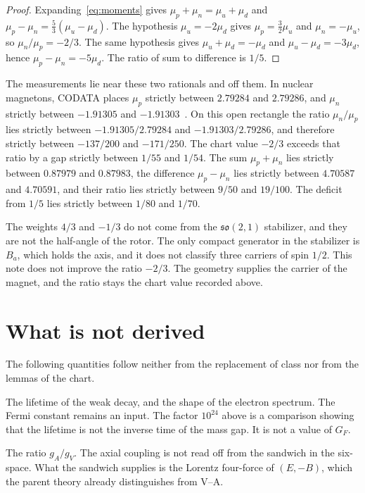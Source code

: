 \documentclass[a4paper]{article}
\begin{document}
\begin{proof}
Expanding~\eqref{eq:moments} gives \(\mu_p+\mu_n=\mu_u+\mu_d\) and \(\mu_p-\mu_n=\tfrac53(\mu_u-\mu_d)\). The hypothesis \(\mu_u=-2\mu_d\) gives \(\mu_p=\tfrac32\mu_u\) and \(\mu_n=-\mu_u\), so \(\mu_n/\mu_p=-2/3\). The same hypothesis gives \(\mu_u+\mu_d=-\mu_d\) and \(\mu_u-\mu_d=-3\mu_d\), hence \(\mu_p-\mu_n=-5\mu_d\). The ratio of sum to difference is \(1/5\).
\end{proof}

The measurements lie near these two rationals and off them. In nuclear magnetons, CODATA places \(\mu_p\) strictly between \(2.79284\) and \(2.79286\), and \(\mu_n\) strictly between \(-1.91305\) and \(-1.91303\)~\cite{codata2018}. On this open rectangle the ratio \(\mu_n/\mu_p\) lies strictly between \(-1.91305/2.79284\) and \(-1.91303/2.79286\), and therefore strictly between \(-137/200\) and \(-171/250\). The chart value \(-2/3\) exceeds that ratio by a gap strictly between \(1/55\) and \(1/54\). The sum \(\mu_p+\mu_n\) lies strictly between \(0.87979\) and \(0.87983\), the difference \(\mu_p-\mu_n\) lies strictly between \(4.70587\) and \(4.70591\), and their ratio lies strictly between \(9/50\) and \(19/100\). The deficit from \(1/5\) lies strictly between \(1/80\) and \(1/70\).

The weights \(4/3\) and \(-1/3\) do not come from the \(\mathfrak{so}(2,1)\) stabilizer, and they are not the half-angle of the rotor. The only compact generator in the stabilizer is \(B_a\), which holds the axis, and it does not classify three carriers of spin \(1/2\). This note does not improve the ratio \(-2/3\). The geometry supplies the carrier of the magnet, and the ratio stays the chart value recorded above.

\section{What is not derived}
\label{sec:open}

The following quantities follow neither from the replacement of class nor from the lemmas of the chart.

The lifetime of the weak decay, and the shape of the electron spectrum. The Fermi constant remains an input. The factor \(10^{24}\) above is a comparison showing that the lifetime is not the inverse time of the mass gap. It is not a value of \(G_F\).

The ratio \(g_A/g_V\). The axial coupling is not read off from the sandwich in the six-space. What the sandwich supplies is the Lorentz four-force of \((E,-B)\), which the parent theory already distinguishes from V--A.
\end{document}

